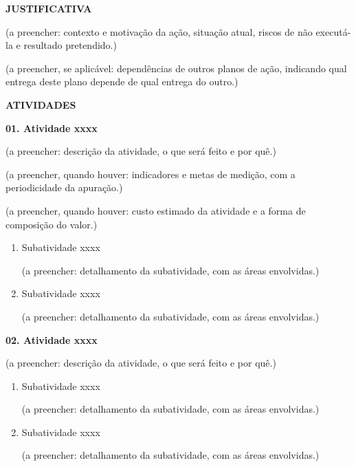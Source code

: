 \documentclass[12pt,a4paper]{article}
\newcommand{\secao}[1]{%
  \par\vspace{\dimexpr16pt-\parskip\relax}%
  {\noindent\bfseries\color{azulTitulo}\fontsize{13}{16}\selectfont #1}%
  \par\vspace{\dimexpr8pt-\parskip\relax}%
}
\newcommand{\atividade}[1]{%
  \par\vspace{\dimexpr16pt-\parskip\relax}%
  {\bfseries\color{azulAtividade}#1}%
  \par\vspace{\dimexpr8pt-\parskip\relax}%
}
\begin{document}
\secao{JUSTIFICATIVA}

(a preencher: contexto e motivação da ação, situação atual, riscos de não executá-la e resultado pretendido.)

(a preencher, se aplicável: dependências de outros planos de ação, indicando qual entrega deste plano depende de qual entrega do outro.)

\secao{ATIVIDADES}

\atividade{01. Atividade xxxx}

(a preencher: descrição da atividade, o que será feito e por quê.)

(a preencher, quando houver: indicadores e metas de medição, com a periodicidade da apuração.)

(a preencher, quando houver: custo estimado da atividade e a forma de composição do valor.)

\begin{enumerate}
  \item Subatividade xxxx

        (a preencher: detalhamento da subatividade, com as áreas envolvidas.)
  \item Subatividade xxxx

        (a preencher: detalhamento da subatividade, com as áreas envolvidas.)
\end{enumerate}

\atividade{02. Atividade xxxx}

(a preencher: descrição da atividade, o que será feito e por quê.)

\begin{enumerate}
  \item Subatividade xxxx

        (a preencher: detalhamento da subatividade, com as áreas envolvidas.)
  \item Subatividade xxxx

        (a preencher: detalhamento da subatividade, com as áreas envolvidas.)
\end{enumerate}
\end{document}
